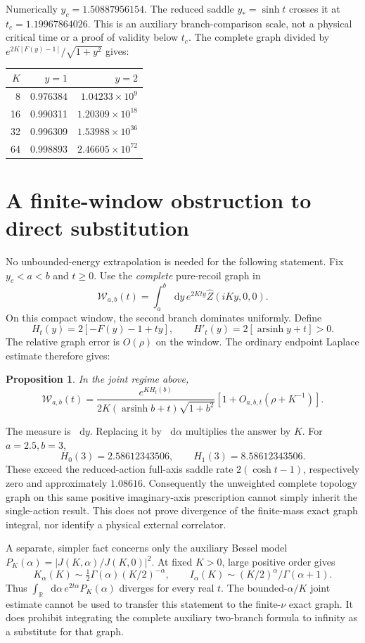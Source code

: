\documentclass[11pt,a4paper]{article}
\newtheorem{proposition}{Proposition}
\newcommand{\dd}{\mathop{}\!\mathrm d}
\begin{document}
Numerically \(y_c=1.50887956154\).
The reduced saddle \(y_*=\sinh t\) crosses it at
\(t_c=1.19967864026\).
This is an auxiliary branch-comparison scale, not a physical critical
time or a proof of validity below \(t_c\).
The complete graph divided by
\(e^{2K[F(y)-1]}/\sqrt{1+y^2}\) gives:
\begin{center}
\begin{tabular}{rrr}
\toprule
\(K\)&\(y=1\)&\(y=2\)\\
\midrule
8&0.976384&\(1.04233\times10^9\)\\
16&0.990311&\(1.20309\times10^{18}\)\\
32&0.996309&\(1.53988\times10^{36}\)\\
64&0.998893&\(2.46605\times10^{72}\)\\
\bottomrule
\end{tabular}
\end{center}

\newpage
\section{A finite-window obstruction to direct substitution}
No unbounded-energy extrapolation is needed for the following statement.
Fix \(y_c<a<b\) and \(t\ge0\).
Use the \emph{complete} pure-recoil graph in
\[
 \mathcal W_{a,b}(t)=\int_a^b\dd y\,e^{2Kty}\widehat Z(iKy,0,0).
\]
On this compact window, the second branch dominates uniformly.
Define
\[
 H_t(y)=2[-F(y)-1+ty],\qquad
 H'_t(y)=2[\operatorname{arsinh}y+t]>0 .
\]
The relative graph error is \(O(\rho)\) on the window.
The ordinary endpoint Laplace estimate therefore gives:
\begin{proposition}
In the joint regime above,
\[
 \mathcal W_{a,b}(t)=
 \frac{e^{KH_t(b)}}{2K(\operatorname{arsinh}b+t)\sqrt{1+b^2}}
 \left[1+O_{a,b,t}(\rho+K^{-1})\right].                            \tag{8}
\]
\end{proposition}
The measure is \(\dd y\). Replacing it by \(\dd\alpha\) multiplies
the answer by \(K\).
For \(a=2.5,b=3\),
\[
 H_0(3)=2.58612343506,\qquad H_1(3)=8.58612343506.
\]
These exceed the reduced-action full-axis saddle rate
\(2(\cosh t-1)\), respectively zero and approximately \(1.08616\).
Consequently the unweighted complete topology graph on this same
positive imaginary-axis prescription cannot simply inherit the
single-action result.
This does not prove divergence of the finite-mass exact graph integral,
nor identify a physical external correlator.

A separate, simpler fact concerns only the auxiliary Bessel model
\(P_K(\alpha)=|J(K,\alpha)/J(K,0)|^2\).
At fixed \(K>0\), large positive order gives
\[
 K_\alpha(K)\sim\tfrac12\Gamma(\alpha)(K/2)^{-\alpha},\qquad
 I_\alpha(K)\sim(K/2)^\alpha/\Gamma(\alpha+1).
\]
Thus \(\int_{\mathbb R}\dd\alpha\,e^{2t\alpha}P_K(\alpha)\)
diverges for every real \(t\).
The bounded-\(\alpha/K\) joint estimate cannot be used to transfer
this statement to the finite-\(\nu\) exact graph.
It does prohibit integrating the complete auxiliary two-branch formula
to infinity as a substitute for that graph.
\end{document}
